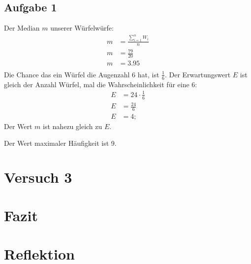 \documentclass[12pt, a4paper, twoside]{article}
\begin{document}
\subsection{Aufgabe 1}
Der Median $m$ unserer Würfelwürfe:
\begin{align*}
  m & = \frac{\sum_{i=1}^{n} W_{i}}{n} \\
  m & = \frac{79}{20}                  \\
  m & =3.95                            \\
\end{align*}
Die Chance das ein Würfel die Augenzahl 6 hat, ist $\frac{1}{6}$.
Der Erwartungswert $E$ ist gleich der Anzahl Würfel, mal die Wahrscheinlichkeit für eine 6:
\begin{align*}
  E & = 24 \cdot \frac{1}{6} \\
  E & = \frac{24}{6}         \\
  E & = 4;
\end{align*}
Der Wert $m$ ist nahezu gleich zu $E$.

Der Wert maximaler Häufigkeit ist 9.


\section{Versuch 3}

\section{Fazit}
\section{Reflektion}
\end{document}
